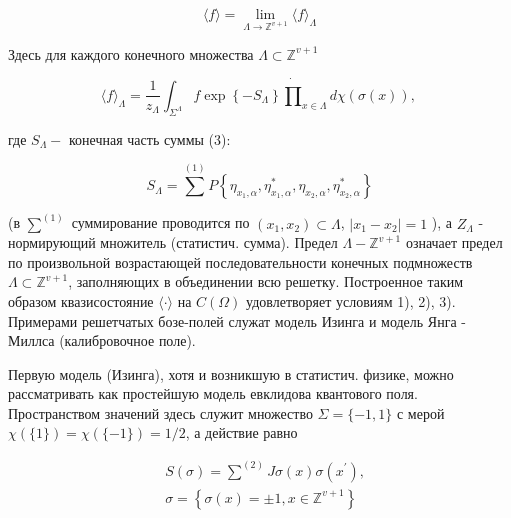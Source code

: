 \documentclass[10pt]{article}
\begin{document}
\[

\langle f\rangle=\lim _{\Lambda \rightarrow \mathbb{Z}^{v+1}}\langle f\rangle_{\Lambda}

\]



Здесь для каждого конечного множества $\Lambda \subset \mathbb{Z}^{v+1}$



\[

\langle f\rangle_{\Lambda}=\frac{1}{z_{\Lambda}} \int_{\Sigma^{\Lambda}} f \exp \left\{-S_{\Lambda}\right\} \dot{\prod}_{x \in \Lambda} d \chi(\sigma(x)) \text {, }

\]



где $S_{\Lambda}-$ конечная часть суммы (3):



\[

S_{\Lambda}=\sum^{(1)} P\left\{\eta_{x_{1}, \alpha}, \eta_{x_{1}, \alpha}^{*}, \eta_{x_{2}, \alpha}, \eta_{x_{2}, \alpha}^{*}\right\}

\]



(в $\sum^{(1)}$ суммирование проводится по $\left(x_{1}, x_{2}\right) \subset \Lambda$, $\left|x_{1}-x_{2}\right|=1$ ), а $Z_{\Lambda}$ - нормирующий множитель (статистич. сумма). Предел $\Lambda-\mathbb{Z}^{v+1}$ означает предел по произвольной возрастающей последовательности конечных подмножеств $\Lambda \subset \mathbb{Z}^{v+1}$, заполняющих в объединении всю решетку. Построенное таким образом квазисостояние $\langle\cdot\rangle$ на $C(\Omega)$ удовлетворяет условиям 1), 2), 3). Примерами решетчатых бозе-полей служат модель Изинга и модель Янга - Миллса (калибровочное поле).



Первую модель (Изинга), хотя и возникшую в статистич. физике, можно рассматривать как простейшую модель евклидова квантового поля. Пространством значений здесь служит множество $\Sigma=\{-1,1\}$ с мерой $\chi(\{1\})=\chi(\{-1\})=1 / 2$, а действие равно



\[

\begin{aligned}

& S(\sigma)=\sum^{(2)} J \sigma(x) \sigma\left(x^{\prime}\right), \\

& \sigma=\left\{\sigma(x)= \pm 1, x \in \mathbb{Z}^{v+1}\right\}

\end{aligned}

\]
\end{document}
